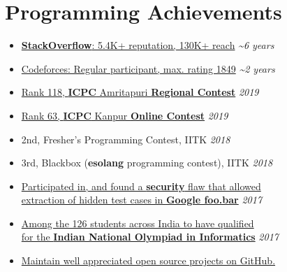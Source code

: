 \section*{\sc Programming Achievements}
\vspace{-2mm}
\hrulefill
\vspace{1mm}

\begin{itemize}
 \item \href{https://stackoverflow.com/users/4121347/dryairship?tab=profile}{\textbf{StackOverflow}: 5.4K+ reputation, 130K+ reach} \hfill \textit{\textasciitilde 6 years}
 \item \href{https://codeforces.com/profile/dryairship}{Codeforces: Regular participant, max. rating 1849} \hfill \textit{\textasciitilde 2 years}
 \item \href{https://icpc.baylor.edu/ICPCID/DAOIPZ63CM1P}{Rank 118, \textbf{ICPC} Amritapuri \textbf{Regional Contest}} \hfill \textit{2019}
 \item \href{https://icpc.baylor.edu/ICPCID/DAOIPZ63CM1P}{Rank 63, \textbf{ICPC} Kanpur \textbf{Online Contest}} \hfill \textit{2019}
 \item 2nd, Fresher's Programming Contest, IITK \hfill \textit{2018}
 \item 3rd, Blackbox (\textbf{esolang} programming contest), IITK \hfill \textit{2018}
 \item \href{https://dryairship.github.io/post/how-i-extracted-hidden-test-cases-in-google-foobar/}{Participated in, and found a \textbf{security} flaw that allowed\\ extraction of hidden test cases in \textbf{Google foo.bar}} \hfill \textit{2017}
 \item \href{https://www.iarcs.org.in/inoi/2018/zio2018/results_zio2018.php#Allahabad}{Among the 126 students across India to have qualified\\ for the \textbf{Indian National Olympiad in Informatics}} \hfill \textit{2017}
 \item \href{https://github.com/dryairship/}{Maintain well appreciated open source projects on GitHub.}
\end{itemize}
